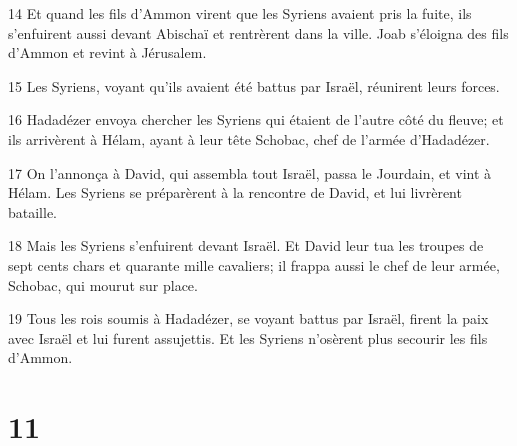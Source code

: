 \par 14 Et quand les fils d'Ammon virent que les Syriens avaient pris la fuite, ils s'enfuirent aussi devant Abischaï et rentrèrent dans la ville. Joab s'éloigna des fils d'Ammon et revint à Jérusalem.
\par 15 Les Syriens, voyant qu'ils avaient été battus par Israël, réunirent leurs forces.
\par 16 Hadadézer envoya chercher les Syriens qui étaient de l'autre côté du fleuve; et ils arrivèrent à Hélam, ayant à leur tête Schobac, chef de l'armée d'Hadadézer.
\par 17 On l'annonça à David, qui assembla tout Israël, passa le Jourdain, et vint à Hélam. Les Syriens se préparèrent à la rencontre de David, et lui livrèrent bataille.
\par 18 Mais les Syriens s'enfuirent devant Israël. Et David leur tua les troupes de sept cents chars et quarante mille cavaliers; il frappa aussi le chef de leur armée, Schobac, qui mourut sur place.
\par 19 Tous les rois soumis à Hadadézer, se voyant battus par Israël, firent la paix avec Israël et lui furent assujettis. Et les Syriens n'osèrent plus secourir les fils d'Ammon.

\chapter{11}

